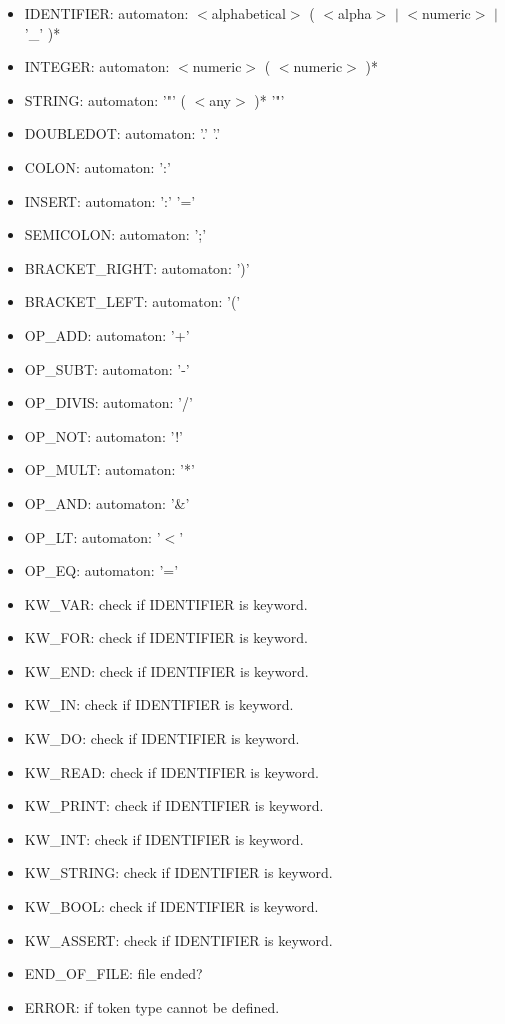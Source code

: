 \documentclass[english,11pt,twoside,a4paper]{article}
\begin{document}
\begin{itemize}
	\item IDENTIFIER: automaton: $<$alphabetical$>$ ( $<$alpha$>$ $|$ $<$numeric$>$ $|$ '\_' )*
	\item INTEGER: automaton: $<$numeric$>$ ( $<$numeric$>$ )*
	\item STRING: automaton: '"' ( $<$any$>$ )* '"'
	\item DOUBLEDOT: automaton: '.' '.'
	\item COLON: automaton: ':'
	\item INSERT: automaton: ':' '='
	\item SEMICOLON: automaton: ';'
	\item BRACKET\_RIGHT: automaton: ')'
	\item BRACKET\_LEFT: automaton: '('
	\item OP\_ADD: automaton: '+'
	\item OP\_SUBT: automaton: '-'
	\item OP\_DIVIS: automaton: '/'
	\item OP\_NOT: automaton: '!'
	\item OP\_MULT: automaton: '*'
	\item OP\_AND: automaton: '\&'
	\item OP\_LT: automaton: '$<$'
	\item OP\_EQ: automaton: '='
	\item KW\_VAR: check if IDENTIFIER is keyword.
	\item KW\_FOR: check if IDENTIFIER is keyword.
	\item KW\_END: check if IDENTIFIER is keyword.
	\item KW\_IN: check if IDENTIFIER is keyword.
	\item KW\_DO: check if IDENTIFIER is keyword.
	\item KW\_READ: check if IDENTIFIER is keyword.
	\item KW\_PRINT: check if IDENTIFIER is keyword.
	\item KW\_INT: check if IDENTIFIER is keyword.
	\item KW\_STRING: check if IDENTIFIER is keyword.
	\item KW\_BOOL: check if IDENTIFIER is keyword.
	\item KW\_ASSERT: check if IDENTIFIER is keyword.
	\item END\_OF\_FILE: file ended?
	\item ERROR: if token type cannot be defined.
\end{itemize}
\end{document}
